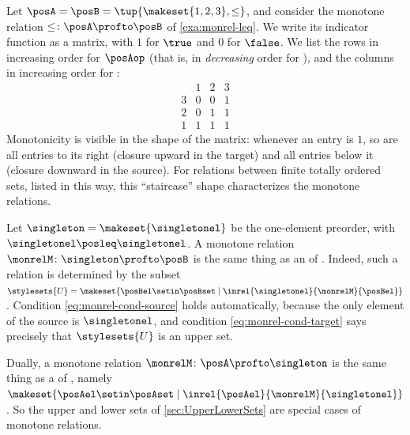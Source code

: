 \begin{example}
    \label{exa:monrel-matrix}
    Let $\posA = \posB = \tup{\makeset{1, 2, 3}, \leq}$, and consider the monotone relation $\leq \colon \posA \profto \posB$ of \cref{exa:monrel-leq}.
    We write its indicator function as a matrix, with $1$ for $\true$ and $0$ for $\false$.
    We list the rows in increasing order for $\posAop$ (that is, in \emph{decreasing} order for \posA), and the columns in increasing order for \posB:
    \begin{equation}
        \begin{array}{c|ccc}
              & 1 & 2 & 3 \\ \hline
            3 & 0 & 0 & 1 \\
            2 & 0 & 1 & 1 \\
            1 & 1 & 1 & 1
        \end{array}
    \end{equation}
    Monotonicity is visible in the shape of the matrix: whenever an entry is $1$, so are all entries to its right (closure upward in the target) and all entries below it (closure downward in the source).
    For relations between finite totally ordered sets, listed in this way, this ``staircase'' shape characterizes the monotone relations.
\end{example}

\begin{example}
    \label{exa:monrel-upper-lower-sets}
    Let $\singleton = \makeset{\singletonel}$ be the one-element preorder, with $\singletonel \posleq \singletonel$.
    A monotone relation $\monrelM \colon \singleton \profto \posB$ is the same thing as an  of \posB.
    Indeed, such a relation is determined by the subset $\stylesets{U} = \makeset{\posBel \setin \posBset \mid \inrel{\singletonel}{\monrelM}{\posBel}}$.
    Condition \cref{eq:monrel-cond-source} holds automatically, because the only element of the source is $\singletonel$, and condition \cref{eq:monrel-cond-target} says precisely that $\stylesets{U}$ is an upper set.

    Dually, a monotone relation $\monrelM \colon \posA \profto \singleton$ is the same thing as a  of \posA, namely $\makeset{\posAel \setin \posAset \mid \inrel{\posAel}{\monrelM}{\singletonel}}$.
    So the upper and lower sets of \cref{sec:UpperLowerSets} are special cases of monotone relations.
\end{example}

